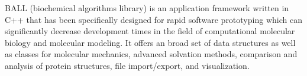 BALL (biochemical algorithms library) is an application framework written in C++ that has been specifically designed for rapid software prototyping which can significantly decrease development times in the field of computational molecular biology and molecular modeling. It offers an broad set of data structures as well as classes for molecular mechanics, advanced solvation methods, comparison and analysis of protein structures, file import/export, and visualization.
